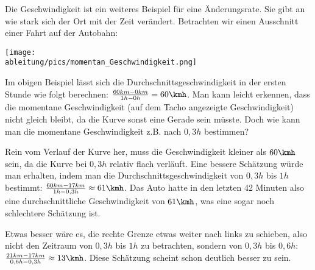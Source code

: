Die Geschwindigkeit ist ein weiteres Beispiel für eine Änderungsrate. Sie gibt an wie stark sich der Ort mit der Zeit verändert. Betrachten wir einen Ausschnitt einer Fahrt auf der Autobahn:

\smallskip

\begin{minipage}[t]{\textwidth}
	\centering\texttt{[image: \\ableitung/pics/momentan\_Geschwindigkeit.png]}
\end{minipage}

Im obigen Beispiel lässt sich die Durchschnittsgeschwindigkeit in der ersten Stunde wie folgt berechnen: \(\frac{60km-0km}{1h-0h}=60\kmh\). Man kann leicht erkennen, dass die momentane Geschwindigkeit (auf dem Tacho angezeigte Geschwindigkeit) nicht gleich bleibt, da die Kurve sonst eine Gerade sein müsste. Doch wie kann man die momentane Geschwindigkeit z.B. nach \(0,3h\) bestimmen?

Rein vom Verlauf der Kurve her, muss die Geschwindigkeit kleiner als \(60\kmh\) sein, da die Kurve bei \(0,3h\) relativ flach verläuft. Eine bessere Schätzung würde man erhalten, indem man die Durchschnittsgeschwindigkeit von \(0,3h\) bis \(1h\) bestimmt: \(\frac{60km-17km}{1h-0,3h}\approx61\kmh\). Das Auto hatte in den letzten 42 Minuten also eine durchschnittliche Geschwindigkeit von \(61\kmh\), was eine sogar noch schlechtere Schätzung ist.

Etwas besser wäre es, die rechte Grenze etwas weiter nach links zu schieben, also nicht den Zeitraum von \(0,3h\) bis \(1h\) zu betrachten, sondern von \(0,3h\) bis \(0,6h\): \(\frac{21km-17km}{0,6h-0,3h}\approx13\kmh\). Diese Schätzung scheint schon deutlich besser zu sein.

